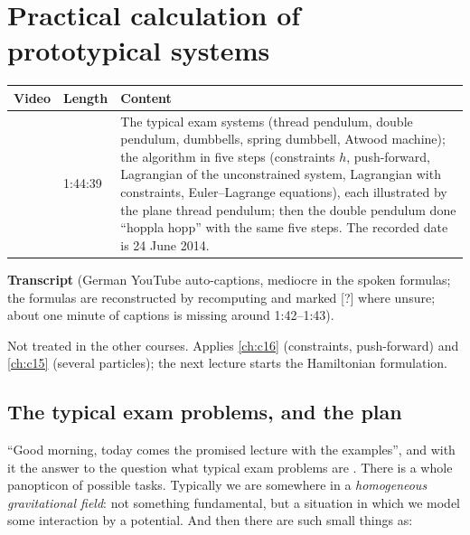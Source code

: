 \chapter{Practical calculation of prototypical systems}\label{ch:c17}
\begin{paracol}{2}

\begin{sources}
\begin{tabularx}{\linewidth}{@{}l l L@{}}
\toprule
\textbf{Video} & \textbf{Length} & \textbf{Content}\\
\midrule
{} & 1:44:39 & The typical exam systems (thread pendulum, double pendulum, dumbbells, spring dumbbell, Atwood machine); the algorithm in five steps (constraints $h$, push-forward, Lagrangian of the unconstrained system, Lagrangian with constraints, Euler--Lagrange equations), each illustrated by the plane thread pendulum; then the double pendulum done ``hoppla hopp'' with the same five steps. The recorded date is 24 June 2014.\\
\bottomrule
\end{tabularx}

\smallskip
\textbf{Transcript}  (German YouTube auto-captions, mediocre in the spoken formulas; the formulas are reconstructed by recomputing and marked [?] where unsure; about one minute of captions is missing around 1:42--1:43).
\end{sources}

\begin{reading}
Not treated in the other courses.
Applies \cref{ch:c16} (constraints, push-forward) and \cref{ch:c15} (several particles); the next lecture starts the Hamiltonian formulation.
\end{reading}

\section{The typical exam problems, and the plan}\label{sec:pc-plan}

``Good morning, today comes the promised lecture with the examples'', and with it the answer to the question what typical exam problems are . There is a whole panopticon of possible tasks. Typically we are somewhere in a \emph{homogeneous gravitational field}: not something fundamental, but a situation in which we model some interaction by a potential. And then there are such small things as:


\end{paracol}
